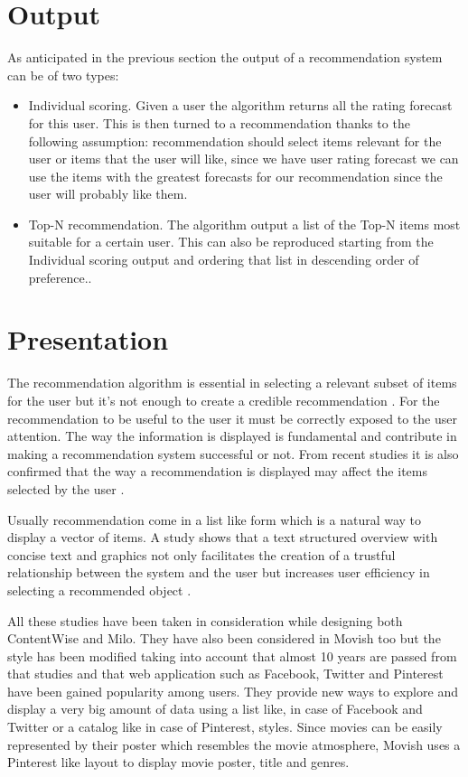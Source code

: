 \section{Output}
\label{sec:Output}

As anticipated in the previous section the output of a recommendation system can be of two types:
\begin{itemize}
\item Individual scoring. Given a user the algorithm returns all the rating forecast for this user. This is then turned to a recommendation thanks to the following assumption: recommendation should select items relevant for the user or items that the user will like, since we have user rating forecast we can use the items with the greatest forecasts for our recommendation since the user will probably like them. 
\item Top-N recommendation. The algorithm output a list of the Top-N items most suitable for a certain user. This can also be reproduced starting from the Individual scoring output and ordering that list in descending order of preference..
\end{itemize}

\section{Presentation}
\label{sec:Presentation}

The recommendation algorithm is essential in selecting a relevant subset of items for the user but it's not enough to create a credible recommendation \cite{applicaion-domain-and-functional-classification}. For the recommendation to be useful to the user it must be correctly exposed to the user attention. The way the information is displayed is fundamental and contribute in making a recommendation system successful or not. From recent studies it is also confirmed that the way a recommendation is displayed may affect the items selected by the user \cite{amazon-case}.

Usually recommendation come in a list like form which is a natural way to display a vector of items. A study shows that a text structured overview with concise text and graphics not only facilitates the creation of a trustful relationship between the system and the user but increases user efficiency in selecting a recommended object \cite{trust-building}.

All these studies have been taken in consideration while designing both ContentWise and Milo. They have also been considered in Movish too but the style has been modified taking into account that almost 10 years are passed from that studies and that web application such as Facebook, Twitter and Pinterest have been gained popularity among users. They provide new ways to explore and display a very big amount of data using a list like, in case of Facebook and Twitter or a catalog like in case of Pinterest, styles. Since movies can be easily represented by their poster which resembles the movie atmosphere, Movish uses a Pinterest like layout to display movie poster, title and genres.

